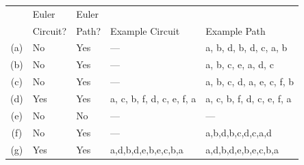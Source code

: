 \begin{questions}
    \ifprintanswers
        \vspace{-10pt}
   \fi
    \begin{solution}
        \begin{tabular}{|c|ll|ll|}
        \hline 
              & Euler & Euler &  & \\
              & Circuit? & Path? & Example Circuit & Example Path \\
        \hline 
            (a) & No & Yes & ---  & a, b, d, b, d, c, a, b \\
        \hline 
            (b) & No & Yes & ---  & a, b, c, e, a, d, c \\
        \hline 
            (c) & No & Yes & ---  & a, b, c, d, a, e, c, f, b \\
        \hline 
            (d) & Yes & Yes & a, c, b, f, d, c, e, f, a & a, c, b, f, d, c, e, f, a \\
        \hline
            (e) & No  & No  & --- &  --- \\
        \hline 
            (f) & No & Yes  & --- & a,b,d,b,c,d,c,a,d \\
        \hline 
            (g) & Yes & Yes & a,d,b,d,e,b,e,c,b,a & a,d,b,d,e,b,e,c,b,a \\
        \hline 
        \end{tabular} 



\end{solution}
\end{questions}
